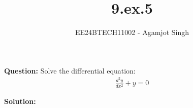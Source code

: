 \documentclass[journal]{IEEEtran}
\begin{document}

\vspace{3cm}

\title{9.ex.5}
\author{EE24BTECH11002 - Agamjot Singh}
{\let\newpage\relax\maketitle}

\renewcommand{\thefigure}{\theenumi}
\renewcommand{\thetable}{\theenumi}
\setlength{\intextsep}{10pt} %

\textbf{Question:}
\newline
Solve the differential equation:
\begin{align}
  \frac{d^2y}{dx^2} + y = 0
\end{align}

\textbf{Solution:}
\end{document}

